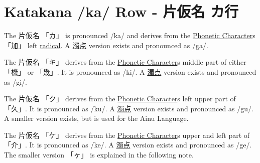 \section{Katakana /ka/ Row - 片仮名 カ行}\label{sec:KatakanaKaRow}


\label{letter:ka} The  片仮名 {「カ」} is pronounced  /ka/ and  derives from the
\hyperref[sec:PhoneticCharacter]{Phonetic Character}s {「加」} left
\hyperref[sec:Radical]{radical}.  A \hyperref[sec:Dakuten]{濁点} version exists
and pronounced as /ga/.




\label{letter:ki} The 片仮名 {「キ」} derives from the
\hyperref[sec:PhoneticCharacter]{Phonetic Character}s middle part of either {「機」} or
{「幾」}.  It is pronounced as /ki/.  A \hyperref[sec:Dakuten]{濁点} version
exists and pronounced as /gi/.


\label{letter:ku} The 片仮名 {「ク」} derives from the
\hyperref[sec:PhoneticCharacter]{Phonetic Character}s left upper part of {「久」}.  It
is pronounced as /ku/.  A \hyperref[sec:Dakuten]{濁点} version exists and
pronounced as /gu/.  A smaller version exists, but is used for the Ainu
Language.



\label{letter:ke} The 片仮名 {「ケ」} derives from the
\hyperref[sec:PhoneticCharacter]{Phonetic Character}s upper and left part of {「介」}.
It is pronounced as /ke/.  A \hyperref[sec:Dakuten]{濁点} version exists and
pronounced as /ge/.  The smaller version {「ヶ」} is explained in the following
note.

\newpage



